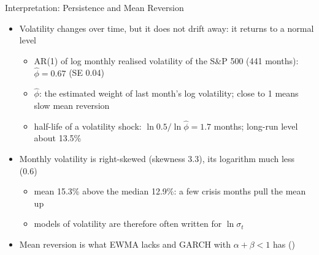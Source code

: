 \begin{frame}{Interpretation: Persistence and Mean Reversion}
\itemsize{\small}
\begin{itemize}
    \item Volatility changes over time, but it does not drift away: it returns to a normal level 
    \begin{itemize}
        \item AR(1) of log monthly realised volatility of the S\&P 500 (441 months): $\hat\phi = 0.67$ (SE 0.04)
        \item $\hat\phi$: the estimated weight of last month's log volatility; close to 1 means slow mean reversion
        \item half-life of a volatility shock: $\ln 0.5/\ln\hat\phi = 1.7$ months; long-run level about 13.5\%
    \end{itemize}
    \item Monthly volatility is right-skewed (skewness 3.3), its logarithm much less (0.6) 
    \begin{itemize}
        \item mean 15.3\% above the median 12.9\%: a few crisis months pull the mean up
        \item models of volatility are therefore often written for $\ln\sigma_t$
    \end{itemize}
    \item Mean reversion is what EWMA lacks and GARCH with $\alpha + \beta < 1$ has ()
\end{itemize}
\end{frame}

